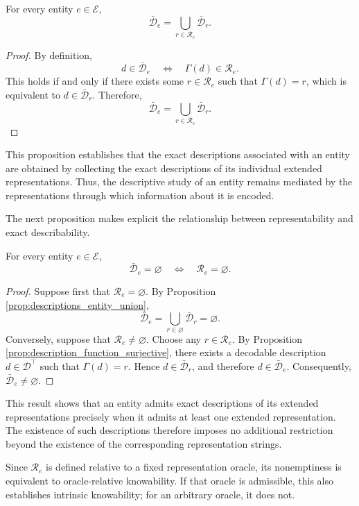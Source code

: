\begin{proposition}
\label{prop:descriptions_entity_union}
For every entity $e\in\mathcal{E}$,
\[
\bar{\mathcal{D}}_e = \bigcup_{r\in\mathcal{R}_e}\bar{\mathcal{D}}_r.
\]
\end{proposition}
\begin{proof}
By definition,
\[
d\in\bar{\mathcal{D}}_e \quad\Longleftrightarrow\quad \Gamma(d)\in\mathcal{R}_e.
\]
This holds if and only if there exists some $r\in\mathcal{R}_e$ such that $\Gamma(d)=r$, which is equivalent to $d\in\bar{\mathcal{D}}_r$. Therefore,
\[
\bar{\mathcal{D}}_e = \bigcup_{r\in\mathcal{R}_e} \bar{\mathcal{D}}_r.
\]
\end{proof}

This proposition establishes that the exact descriptions associated with an entity are obtained by collecting the exact descriptions of its individual extended representations. Thus, the descriptive study of an entity remains mediated by the representations through which information about it is encoded.

The next proposition makes explicit the relationship between representability and exact describability.

\begin{proposition}
\label{prop:descriptions_entity_empty_iff_repr_empty}
For every entity $e\in\mathcal{E}$,
\[
\bar{\mathcal{D}}_e=\varnothing \quad\Longleftrightarrow\quad \mathcal{R}_e=\varnothing.
\]
\end{proposition}
\begin{proof}
Suppose first that $\mathcal{R}_e=\varnothing$. By Proposition \ref{prop:descriptions_entity_union},
\[
\bar{\mathcal{D}}_e = \bigcup_{r\in\varnothing}\bar{\mathcal{D}}_r = \varnothing.
\]
Conversely, suppose that $\mathcal{R}_e\neq\varnothing$. Choose any $r\in\mathcal{R}_e$. By Proposition \ref{prop:description_function_surjective}, there exists a decodable description $d\in\mathcal{D}^\top$ such that $\Gamma(d)=r$. Hence $d\in\bar{\mathcal{D}}_r$, and therefore $d\in\bar{\mathcal{D}}_e$. Consequently, $\bar{\mathcal{D}}_e\neq\varnothing$.
\end{proof}

This result shows that an entity admits exact descriptions of its extended representations precisely when it admits at least one extended representation. The existence of such descriptions therefore imposes no additional restriction beyond the existence of the corresponding representation strings.

Since $\mathcal{R}_e$ is defined relative to a fixed representation oracle, its nonemptiness is equivalent to oracle-relative knowability. If that oracle is admissible, this also establishes intrinsic knowability; for an arbitrary oracle, it does not.

